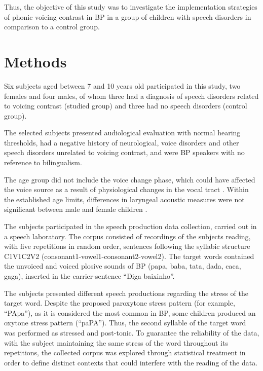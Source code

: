 Thus, the objective of this study was to investigate the implementation
strategies of phonic voicing contrast in BP in a group of children with speech
disorders in comparison to a control group.

\section{Methods}
Six subjects aged between 7 and 10 years old participated in this study, two
females and four males, of whom three had a diagnosis of speech disorders
related to voicing contrast (studied group) and three had no speech disorders
(control group).

The selected subjects presented audiological evaluation with normal hearing
thresholds, had a negative history of neurological, voice disorders and other
speech disorders unrelated to voicing contrast, and were BP speakers with no
reference to bilingualism.

The age group did not include the voice change phase, which could have affected
the voice source as a result of physiological changes in the vocal tract
\citep{behlau1995}. Within the established age limits, differences in
laryngeal acoustic measures were not significant between male and female
children \citep{andrade2009}.

The subjects participated in the speech production data collection, carried out
in a speech laboratory. The corpus consisted of recordings of the subjects
reading, with five repetitions in random order, sentences following the
syllabic structure C1V1C2V2 (consonant1-vowel1-consonant2-vowel2). The target
words contained the unvoiced and voiced plosive sounds of BP (papa, baba, tata,
dada, caca, gaga), inserted in the carrier-sentence “Diga
\underline{\hspace{4ex}} baixinho”.

The subjects presented different speech productions regarding the stress of the
target word. Despite the proposed paroxytone stress pattern (for example,
“PApa”), as it is considered the most common in BP, some children produced an
oxytone stress pattern (“paPA”). Thus, the second syllable of the target word
was performed as stressed and post-tonic. To guarantee the reliability of the
data, with the subject maintaining the same stress of the word throughout its
repetitions, the collected corpus was explored through statistical treatment in
order to define distinct contexts that could interfere with the reading of the
data.

